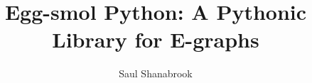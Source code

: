 \documentclass[sigplan,screen,review]{acmart}
\begin{document}
\VerbatimFootnotes
\title{Egg-smol Python: A Pythonic Library for E-graphs}

\author{Saul Shanabrook}





\end{document}
